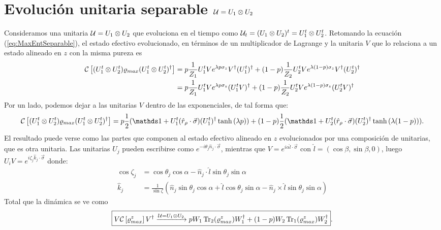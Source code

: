\section{Evolución unitaria separable $\mathcal{U}=U_{1}\otimes U_{2}$}

Consideramos una unitaria $\mathcal{U}=U_{1}\otimes U_{2}$ que evoluciona en el tiempo como $\mathcal{U}_{t}=(U_{1}\otimes U_{2})^{t}=U_{1}^{t}\otimes U_{2}^{t}$. Retomando la ecuación (\ref{eq:MaxEntSeparable}), el estado efectivo evolucionado, en términos de un multiplicador de Lagrange y la unitaria $V$ que lo relaciona a un estado alineado en $z$ con la misma pureza es
\begin{align*}
    \mathcal{C}\left[(U_{1}^{t}\otimes U_{2}^{t})\varrho_{max}(U_{1}^{t}\otimes U_{2}^{t})^{\dag}\right]&=p\frac{1}{Z_{1}}U_{1}^{t}V e^{\lambda p \sigma_{z}}V^{\dag}(U_{1}^t)^{\dag}+(1-p)\frac{1}{Z_{2}}U_{2}^{t}Ve^{\lambda (1-p)\sigma_{z}}V^{\dag}(U_{2}^t)^{\dag}\\
    &=p\frac{1}{Z_{1}}U_{1}^{t}V e^{\lambda p \sigma_{z}}(U_{1}^tV)^{\dag}+(1-p)\frac{1}{Z_{2}}U_{2}^{t}Ve^{\lambda (1-p)\sigma_{z}}(U_{2}^tV)^{\dag}\\
\end{align*}
Por un lado, podemos dejar a las unitarias $V$ dentro de las exponenciales, de tal forma que:
\begin{equation}
    \CG{(U_{1}^{t}\otimes U_{2}^{t})\varrho_{max}(U_{1}^{t}\otimes U_{2}^{t})^{\dag}}=p\frac{1}{2}(\Id+U_{1}^{t}(\hat{r}_{\rho}\cdot\vec{\sigma})(U_{1}^{t})^{\dag}\tanh{(\lambda p)})+(1-p)\frac{1}{2}(\Id+U_{2}^{t}(\hat{r}_{\rho}\cdot\vec{\sigma})(U_{2}^{t})^{\dag}\tanh{(\lambda (1-p))}).
\end{equation}
El resultado puede verse como las partes que componen al estado efectivo alineado en $z$ evolucionados por una composición de unitarias, que es otra unitaria. Las unitarias $U_{j}$ pueden escribirse como $e^{-i\theta_{j} \hat{n}_{j}\cdot\vec{\sigma}}$, mientras que $V=e^{i\alpha\hat{l}\cdot\vec{\sigma}}$ con $\hat{l}=(\cos{\beta},\sin{\beta},0)$, luego $U_{i}V=e^{i\zeta_{j} \hat{k}_{j}\cdot \vec{\sigma}}$ donde:
\begin{align*}
    \cos{\zeta_{j} }&=\cos{\theta_{j}}\cos{\alpha}-\hat{n}_{j}\cdot \hat{l}\sin{\theta_{j}}\sin{\alpha}\\
    \hat{k}_{j} &=\frac{1}{\sin{\zeta}}(\hat{n}_{j}\sin{\theta_{j}}\cos{\alpha}+\hat{l}\cos{\theta_{j}}\sin{\alpha}-\hat{n}_{j}\times \hat{l}\sin{\theta_{j}}\sin{\alpha})
\end{align*}
Total que la dinámica se ve como
\begin{equation}
    \boxed{V\mathcal{C}\left[\varrho_{max}^{z}\right]V^{\dag} \xrightarrow{\mathcal{U}=U_{1}\otimes U_{2}} pW_{1}\Tr_{2}(\varrho_{max}^{z})W_{1}^{\dag}+(1-p)W_{2}\Tr_{1}(\varrho_{max}^{z})W_{2}^{\dag}}.
\end{equation}
